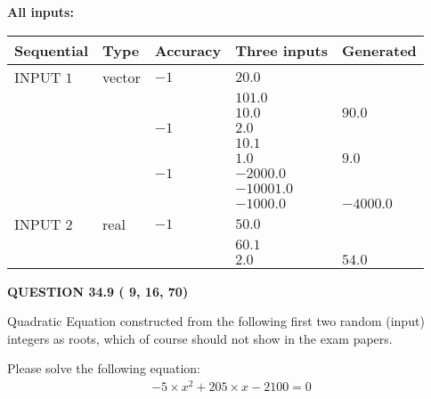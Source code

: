 \documentclass[12pt]{article}
\begin{document}
   
   
   
\noindent\vspace{0.1in}\hspace{-0.08in} {\textbf{\Large{All inputs: }}}
   
   
  
  
\noindent\begin{tabular}{|l|l|l|l|l|}
\hline
 Sequential & Type & Accuracy & Three inputs & Generated \\ 
\hline
 
 
  INPUT $           1$ & vector & $          -1 $ & $
20.0
  $ & \\
  & & & $
101.0
  $ & \\
  & & & $
10.0
$ & $ 90.0 $ 
  \\
  & & $          -1 $ & $
2.0
  $ & \\
  & & & $
10.1
  $ & \\
  & & & $
1.0
$ & $ 9.0 $ 
  \\
  & & $          -1 $ & $
-2000.0
  $ & \\
  & & & $
-10001.0
  $ & \\
  & & & $
-1000.0
$ & $ -4000.0 $ 
 \\  \hline  
 
 
  INPUT $           2$ & real & $          -1 $ & $
 50.0
  $ & \\
  & & &  $
 60.1
  $ & \\
  & & &  $
 2.0
 $ & $ 54.0 $ 
 \\  \hline  
 \end{tabular}
   
   
  
\vspace{0.2in}
  
{\textbf{\Large{QUESTION
34.9 
 (          9,         16,         70)
}}}
  
  


\noindent{}
Quadratic Equation constructed from the following first two random (input) integers as roots,  
which of course should not show in the exam papers.  
\noindent{}


 
 

 
Please solve the following equation:
\begin{eqnarray*}
-5 \times x^2  %
+  %
205
                 \times x    %
-2100 =0
\end{eqnarray*}
 
\end{document}
